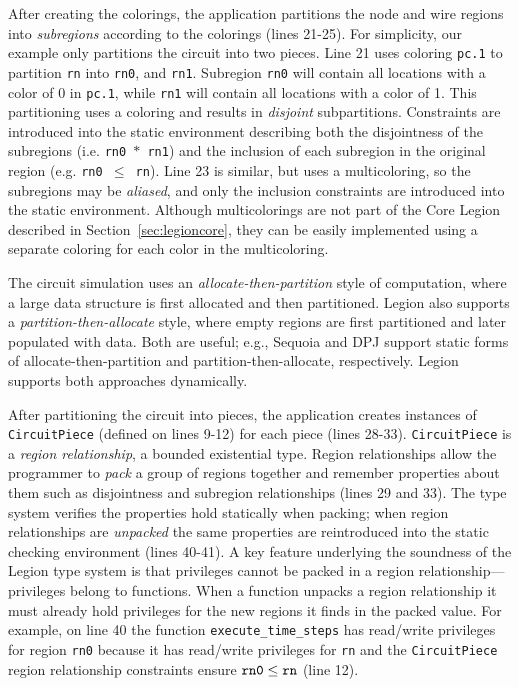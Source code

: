 After creating the colorings, the application partitions the node and wire
regions into {\em subregions} according to the colorings (lines 21-25).  For
simplicity, our example only partitions the circuit into two pieces.
Line 21 uses coloring {\tt pc.1} to partition {\tt rn} into {\tt rn0}, and {\tt rn1}.
Subregion {\tt rn0} will contain all locations with a color of 0 in {\tt pc.1},
while {\tt rn1} will contain all locations with a color of 1.  This
partitioning uses a coloring and results in {\em disjoint} subpartitions.
Constraints are introduced into the static environment describing both the
disjointness of the subregions (i.e. {\tt rn0 $*$ rn1}) and the inclusion of
each subregion in the original region (e.g. {\tt rn0 $\leq$ rn}).  Line
23 is similar, but uses a multicoloring, so the subregions may be {\em aliased},
and only the inclusion constraints are introduced into the static environment.
Although multicolorings are not part of the Core Legion described in 
Section~\ref{sec:legioncore}, they can be easily implemented using a separate 
coloring for each color in the multicoloring.

The circuit simulation uses an {\em allocate-then-partition} style of
computation, where a large data structure is first allocated and then
partitioned.  Legion also supports a {\em partition-then-allocate} style,
where empty regions are first partitioned and later populated with
data.  Both are useful; e.g., Sequoia \cite{Fatahalian06} and DPJ
\cite{Bocchino09} support static forms of allocate-then-partition and
partition-then-allocate, respectively.  Legion supports both
approaches dynamically.

After partitioning the circuit into pieces, the application creates
instances of {\tt CircuitPiece} (defined on lines 9-12) for each piece
(lines 28-33).  {\tt CircuitPiece} is a {\em region relationship}, a
bounded existential type.  Region relationships allow the programmer
to {\em pack} a group of regions together and remember properties
about them such as disjointness and subregion relationships (lines 29
and 33).  The type system verifies the properties hold statically when
packing; when region relationships are {\em unpacked} the same
properties are reintroduced into the static checking environment
(lines 40-41).  A key feature underlying the soundness of the Legion
type system is that privileges cannot be packed in a region
relationship---privileges belong to functions. When a function unpacks
a region relationship it must already hold privileges for the new
regions it finds in the packed value.  For example, on line 40 the
function {\tt execute\_time\_steps} has read/write privileges for
region {\tt rn0} because it has read/write privileges for {\tt rn} and
the {\tt CircuitPiece} region relationship constraints ensure $\tt rn0
\leq rn$ (line 12).

